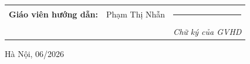 \vfill

\noindent
\hspace{1.5cm}%
\begin{minipage}[t]{0.88\textwidth}

\begin{tabular}{@{}p{4.5cm}p{3.5cm}l@{}}
{\fontsize{13pt}{18pt}\selectfont \textbf{Giáo viên hướng dẫn:}} &
{\fontsize{13pt}{18pt}\selectfont Phạm Thị Nhẫn} &
\rule{3.5cm}{0.4pt} \\[-2pt]
& &
{\fontsize{11pt}{14pt}\selectfont \textit{Chữ ký của GVHD}}
\\[0.3cm]
\end{tabular}

\end{minipage}

\vspace{1.8cm}

\begin{center}
{\fontsize{14pt}{17pt}\selectfont Hà Nội, 06/2026}
\end{center}

\vspace{0.5cm}

\clearpage
